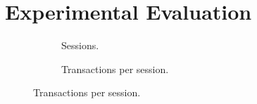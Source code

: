 
\section{Experimental Evaluation}\label{sec:exp}

% 

\begin{figure}
\centering
 \begin{subfigure}{.33\textwidth}
  \caption{Sessions.}
  \label{ser_node_scale}
 \end{subfigure}
 \hspace{-3mm}
 \begin{subfigure}{.33\textwidth}
  \caption{Transactions per session.}
  \label{ser_transaction_scale}
 \end{subfigure}


\end{figure}
